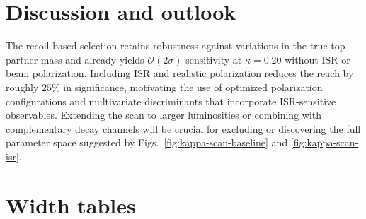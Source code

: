 \documentclass[11pt]{article}
\begin{document}
\section{Discussion and outlook}
The recoil-based selection retains robustness against variations in the true top
partner mass and already yields $\mathcal{O}(2\sigma)$ sensitivity at
$\kappa=0.20$ without ISR or beam polarization.  Including ISR and realistic
polarization reduces the reach by roughly $25\%$ in significance, motivating the
use of optimized polarization configurations and multivariate discriminants
that incorporate ISR-sensitive observables.  Extending the scan to larger
luminosities or combining with complementary decay channels will be crucial for
excluding or discovering the full parameter space suggested by
Figs.~\ref{fig:kappa-scan-baseline} and \ref{fig:kappa-scan-isr}.

\appendix
\section{Width tables}\label{app:widths}

\end{document}
